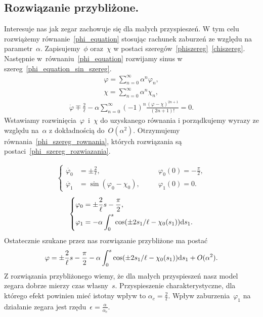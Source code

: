 \newpage
\subsection{Rozwiązanie przybliżone.}
Interesuje nas jak zegar zachowuje się dla małych przyspieszeń. 
W tym celu rozwiążemy równanie~\eqref{phi_equation} stosując 
rachunek zaburzeń ze względu na 
parametr~$\alpha$. Zapisujemy~$\phi$ oraz~$\chi$ w postaci
szeregów~\eqref{phiszereg}~\eqref{chiszereg}. 
Następnie w~równaniu~\eqref{phi_equation} rozwijamy sinus 
w szereg~\eqref{phi_equation_sin_szereg}. 
\begin{align}\label{phiszereg}
\varphi = \sum_{n=0}^{\infty} \alpha^n \varphi_n, \\
\chi = \sum_{n=0}^{\infty} \alpha^n \chi_n , \label{chiszereg}
\end{align}
\begin{align}\label{phi_equation_sin_szereg}
\dot{\varphi} \mp \frac{2}{\ell} - \alpha
\sum_{n=0}^{\infty} (-1)^n 
\frac{(\varphi-\chi)^{2n+1}}{(2n+1)!} =0.
\end{align}
Wstawiamy 
rozwinięcia~$\varphi$~i~$\chi$ do uzyskanego równania i porządkujemy wyrazy
ze względu na~$\alpha$ z dokładnością do~$O(\alpha^2)$.
 Otrzymujemy równania~\eqref{phi_szereg_rownania}, których 
rozwiązania są postaci~\eqref{phi_szereg_rozwiazania}.

\begin{align}\label{phi_szereg_rownania}
\left\{ 
\begin{aligned}
\dot{\varphi_0} & = \pm \frac{2}{\ell} , &\quad & 
\varphi_0(0)=-\frac{\pi}{2},\\
\dot{\varphi_1} & = \sin (\varphi_0 - \chi_0  ), &\quad & 
\varphi_1(0) = 0 .
\end{aligned}
\right.
\end{align}
\begin{align}\label{phi_szereg_rozwiazania}
\left\{ 
\begin{aligned}
\varphi_0 & =  \pm \frac{2}{\ell}s - \frac{\pi}{2},\\
\varphi_1 & =  -\alpha \int_0^s \cos 
(\pm 2 s_1 / \ell  - \chi_0(s_1)  ) \text{d} s_1 .
\end{aligned}
\right.
\end{align}
Ostatecznie szukane przez nas rozwiązanie przybliżone ma 
postać
\begin{align}\label{phi_szereg_rozwiazanie}
\varphi =  \pm \frac{2}{\ell}s - \frac{\pi}{2} 
-\alpha  \int_0^s \cos (\pm 2 s_1 / \ell  - \chi_0(s_1)  ) \text{d} s_1 
+O(\alpha^2).
\end{align}
Z rozwiązania przybliżonego wiemy, 
że dla małych przyspieszeń nasz model zegara dobrze 
mierzy czas własny~$s$. Przyspieszenie charakterystyczne, dla 
którego efekt powinien mieć istotny wpływ to
$\alpha_c = \frac{2}{\ell}$.
Wpływ zaburzenia~$\varphi_1$ na działanie zegara jest 
rzędu~$\epsilon = \frac{\alpha}{\alpha_c}.$
